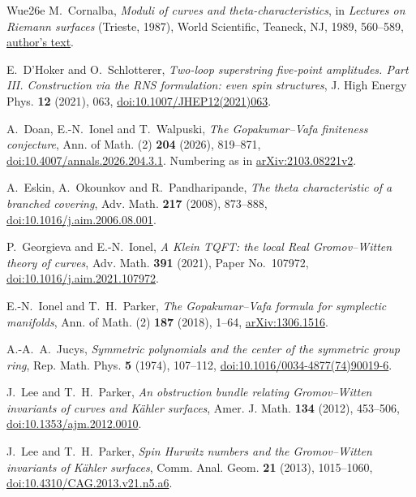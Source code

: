 \begin{thebibliography}{Wue26e}
 M.~Cornalba, \emph{Moduli of curves and theta-characteristics},
in \emph{Lectures on Riemann surfaces} (Trieste, 1987), World Scientific, Teaneck, NJ, 1989, 560--589,
\href{https://mate.unipv.it/cornalba/papers/theta_moduli.pdf}{author's text}.

 E.~D'Hoker and O.~Schlotterer, \emph{Two-loop superstring five-point amplitudes. Part III. Construction via the RNS formulation: even spin structures}, J. High Energy Phys. \textbf{12} (2021), 063, \href{https://doi.org/10.1007/JHEP12(2021)063}{doi:10.1007/JHEP12(2021)063}.

 A.~Doan, E.-N.~Ionel and T.~Walpuski,
\emph{The Gopakumar--Vafa finiteness conjecture},
Ann. of Math. (2) \textbf{204} (2026), 819--871,
\href{https://doi.org/10.4007/annals.2026.204.3.1}{doi:10.4007/annals.2026.204.3.1}.
Numbering as in \href{https://arxiv.org/abs/2103.08221v2}{arXiv:2103.08221v2}.

 A.~Eskin, A.~Okounkov and R.~Pandharipande,
\emph{The theta characteristic of a branched covering}, Adv. Math.
\textbf{217} (2008), 873--888,
\href{https://doi.org/10.1016/j.aim.2006.08.001}{doi:10.1016/j.aim.2006.08.001}.

 P.~Georgieva and E.-N.~Ionel,
\emph{A Klein TQFT: the local Real Gromov--Witten theory of curves},
Adv. Math. \textbf{391} (2021), Paper No.~107972,
\href{https://doi.org/10.1016/j.aim.2021.107972}{doi:10.1016/j.aim.2021.107972}.

 E.-N.~Ionel and T.~H.~Parker,
\emph{The Gopakumar--Vafa formula for symplectic manifolds},
Ann. of Math. (2) \textbf{187} (2018), 1--64,
\href{https://arxiv.org/abs/1306.1516}{arXiv:1306.1516}.

 A.-A.~A.~Jucys,
\emph{Symmetric polynomials and the center of the symmetric group ring},
Rep. Math. Phys. \textbf{5} (1974), 107--112,
\href{https://doi.org/10.1016/0034-4877(74)90019-6}{doi:10.1016/0034-4877(74)90019-6}.

 J.~Lee and T.~H.~Parker,
\emph{An obstruction bundle relating Gromov--Witten invariants of curves
and K\"ahler surfaces}, Amer. J. Math. \textbf{134} (2012), 453--506,
\href{https://doi.org/10.1353/ajm.2012.0010}{doi:10.1353/ajm.2012.0010}.

 J.~Lee and T.~H.~Parker,
\emph{Spin Hurwitz numbers and the Gromov--Witten invariants of K\"ahler surfaces},
Comm. Anal. Geom. \textbf{21} (2013), 1015--1060,
\href{https://doi.org/10.4310/CAG.2013.v21.n5.a6}{doi:10.4310/CAG.2013.v21.n5.a6}.


\end{thebibliography}
